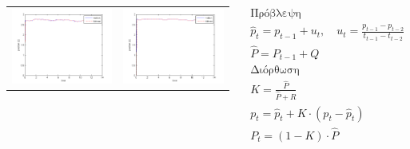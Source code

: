\documentclass[8pt,sans,mathserif]{beamer}%
\begin{document}
\begin{frame}
\begin{columns}
\begin{tabular}{cc}
            \includegraphics[height = 0.30\textheight, keepaspectratio]{fig/filter0-z.png} & \includegraphics[height = 0.30\textheight, keepaspectratio]{fig/filter3-z.png}\\
        \end{tabular}

        \pause

        \begin{equation*}
            \begin{gathered}
                \text{Πρόβλεψη} \\
                \hat{p}_{t} = p_{t-1} + u_{t}, \quad u_{t} = \frac{p_{t-1} - p_{t-2}}{t_{t-1} - t_{t-2}} \\
                \hat{P} = P_{t-1} + Q \\[.5cm]
                \text{Διόρθωση} \\
                Κ = \frac{\hat{P}}{\hat{P} + R}\\
                p_{t} = \hat{p}_{t} + K \cdot (p_{t} - \hat{p}_{t}) \\
                P_{t} = (1 - K) \cdot \hat{P}
            \end{gathered}
        \end{equation*}


\end{columns}
\end{frame}
\end{document}
